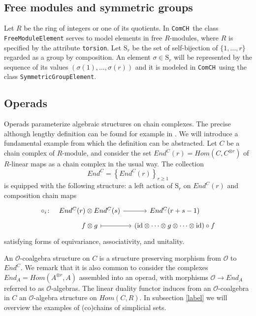 \documentclass{amsart}
\renewcommand{\S}{\mathrm S}
\newcommand{\comch}{\texttt{ComCH}}
\newcommand{\id}{\mathrm{id}}
\begin{document}
\subsection{Free modules and symmetric groups}

Let $R$ be the ring of integers or one of its quotients. In \comch\, the class \texttt{FreeModuleElement} serves to model elements in free $R$-modules, where $R$ is specified by the attribute \texttt{torsion}. Let $\S_r$ be the set of self-bijection of $\{1, \dots, r\}$ regarded as a group by composition. An element $\sigma \in \S_r$ will be represented by the sequence of its values $(\sigma(1), \dots, \sigma(r))$ and it is modeled in \comch\, using the class \texttt{SymmetricGroupElement}.

\subsection{Operads}

Operads parameterize algebraic structures on chain complexes. The precise although lengthy definition can be found for example in \cite{Markl08}. We will introduce a fundamental example from which the definition can be abstracted. Let $C$ be a chain complex of $R$-module, and consider the set $End^C(r) = Hom(C, C^{\otimes r})$ of $R$-linear maps as a chain complex in the usual way. The collection 
\begin{equation*}
End^C = \left\{End^C(r)\right\}_{r \geq 1}
\end{equation*}
is equipped with the following structure: a left action of $\S_r$ on $End^C(r)$ and composition chain maps
\begin{equation*}
\begin{tikzcd}[column sep=small, row sep=tiny]
\circ_i \colon &[-10pt] End^C(r) \otimes End^C(s) \arrow[r] & End^C(r+s-1) \\
& f \otimes g \arrow[r, |->] & (\id \otimes \cdots \otimes g \otimes \cdots \otimes \id) \circ f 
\end{tikzcd}
\end{equation*}
satisfying forms of equivariance, associativity, and unitality.

An $\mathcal O$-coalgebra structure on $C$ is a structure preserving morphism from $\mathcal O$ to $End^C$. We remark that it is also common to consider the complexes $End_A = Hom(A^{\otimes r}, A)$ assembled into an operad, with morphisms $\mathcal O \to End_A$ referred to as $\mathcal O$-algebras. The linear duality functor induces from an $\mathcal O$-coalgebra in $C$ an $\mathcal O$-algebra structure on $Hom(C, R)$. In subsection \ref{label} we will overview the examples of (co)chains of simplicial sets.
\end{document}
